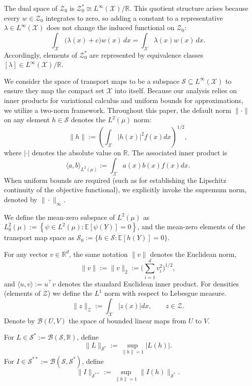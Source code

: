 \documentclass[12pt,leqno]{amsart}
\begin{document}
The dual space of $\mathcal{Z}_0$ is $\mathcal{Z}_0^* \cong L^\infty(\mathcal{X})/\mathbb{R}$.
This quotient structure arises because every $w \in \mathcal{Z}_0$ integrates to zero, so adding a constant to a representative $\lambda \in L^\infty(\mathcal{X})$ does not change the induced functional on $\mathcal{Z}_0$:
\[
\int_{\mathcal{X}} \big(\lambda(x)+c\big)w(x)\,dx
=
\int_{\mathcal{X}} \lambda(x)w(x)\,dx.
\]
Accordingly, elements of $\mathcal{Z}_0^*$ are represented by equivalence classes $[\lambda] \in L^\infty(\mathcal{X})/\mathbb{R}$.

We consider the space of transport maps to be a subspace $\mathcal{S}\subseteq L^\infty(\mathcal{X})$ to ensure they map the compact set $\mathcal{X}$ into itself. Because our analysis relies on inner products for variational calculus and uniform bounds for approximations, we utilize a two-norm framework. Throughout this paper, the default norm $\| \cdot \|$ on any element $h\in\mathcal{S}$ denotes the $L^2(\mu)$ norm:
\[ 
\|h\| := \left(\int_{\mathcal{X}}|h(x)|^2 f(x)dx\right)^{1/2}, 
\]
where $|\cdot|$ denotes the absolute value on $\mathbb{R}$. The associated inner product is
\[
\langle a,b\rangle_{L^2(\mu)} := \int_{\mathcal{X}} a(x)b(x)f(x)dx. 
\]
When uniform bounds are required (such as for establishing the Lipschitz continuity of the objective functional), we explicitly invoke the supremum norm, denoted by $\| \cdot \|_\infty$.

We define the mean-zero subspace of $L^2(\mu)$ as $L^2_0(\mu) := \left\{ \psi \in L^2(\mu) : \mathbb{E}[\psi(Y)] = 0 \right\}$, and the mean-zero elements of the transport map space as $\mathcal{S}_0 := \{h \in \mathcal{S} : \mathbb{E}[h(Y)] = 0\}$.

For any vector $v\in\mathbb{R}^d$, the same notation $\|v\|$ denotes the Euclidean norm,
\[
\|v\| := \|v\|_2 := \Big(\sum_{i=1}^d v_i^2\Big)^{1/2},
\]
and $\langle u,v\rangle := u^\top v$ denotes the standard Euclidean inner product.
For densities (elements of $\mathcal{Z}$) we define the $L^1$ norm with respect to Lebesgue measure.
\[
\|z\| _{\mathcal{Z}}:=\int_{\mathcal{X}}|z(x)|dx,\qquad z\in \mathcal{Z}.
\]
Denote by $\mathcal{B}(U,V)$ the space of bounded linear maps from $U$ to $V$.

For $L\in \mathcal{S}^*:=\mathcal{B}(\mathcal{S},\mathbb R)$, define
\[
\|L\|_{\mathcal{S}^*} :=\sup_{\|h\|=1}|L(h)|.
\]
For $I\in \mathcal{S}^{**}:=\mathcal{B}(\mathcal{S},\mathcal{S}^*)$, define
\[
\|I\|_{\mathcal{S}^{**}} :=\sup_{\|h\|=1}\|I(h)\|_{\mathcal{S}^*}.
\]
\end{document}
